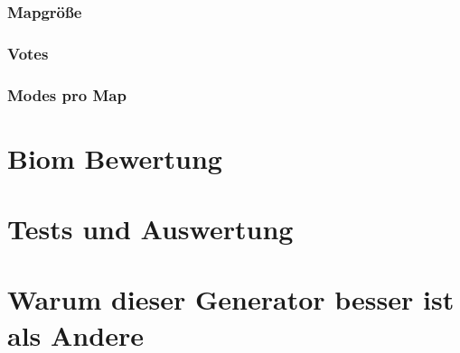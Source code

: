 \documentclass[a4paper, 11pt]{scrreprt}
\begin{document}
    \subsection{Mapgröße}
    \subsection{Votes}
    \subsection{Modes pro Map}

    \chapter{Biom Bewertung}
    \chapter{}
    \chapter{Tests und Auswertung}

    \chapter{Warum dieser Generator besser ist als Andere}
    \newpage

    \printbibliography[title=Literaturverzeichnis]
\end{document}
